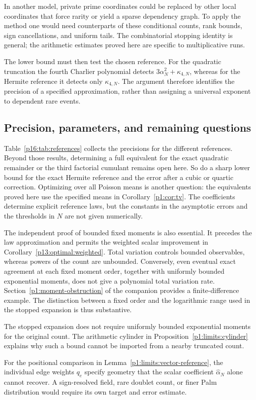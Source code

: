 In another model, private prime coordinates could be replaced by other
local coordinates that force rarity or yield a sparse dependency graph.
To apply the method one would need counterparts of these conditional
counts, rank bounds, sign cancellations, and uniform tails. The
combinatorial stopping identity is general; the arithmetic estimates
proved here are specific to multiplicative runs.

The lower bound must then test the chosen reference. For the quadratic
truncation the fourth Charlier polynomial detects
$3\alpha_N^2+\kappa_{4,N}$, whereas for the Hermite reference it detects
only $\kappa_{4,N}$. The argument therefore identifies the precision of a
specified approximation, rather than assigning a universal exponent to
dependent rare events.

\subsection{Precision, parameters, and remaining questions}

Table~\ref{p16:tab:references} collects the precisions for the
different references. Beyond those results, determining a full
equivalent for the exact quadratic remainder or the third factorial
cumulant remains open here. So do a sharp lower bound for the exact
Hermite reference and the error after a cubic or quartic correction.
Optimizing over all Poisson means is another question: the equivalents
proved here use the specified means in Corollary~\ref{p1:cor:tv}.
The coefficients determine explicit reference laws, but the constants
in the asymptotic errors and the thresholds in \(N\) are not given
numerically.

The independent proof of bounded fixed moments is also
essential. It precedes the law approximation and permits
the weighted scalar improvement in
Corollary~\ref{p13:optimal:weighted}.
Total variation controls bounded observables,
whereas powers of the count are unbounded. Conversely,
even eventual exact agreement at each fixed moment order, together
with uniformly bounded exponential moments, does not give
a polynomial total variation rate. Section~\ref{p1:moment-obstruction} of the companion
provides a finite-difference example. The distinction between
a fixed order and the logarithmic range used in the stopped
expansion is thus substantive.

The stopped expansion does not require uniformly bounded exponential
moments for the original count. The arithmetic cylinder in
Proposition~\ref{p1:limits:cylinder} explains why such a bound cannot be
imported from a nearby truncated count.

For the positional comparison in
Lemma~\ref{p1:limits:vector-reference}, the individual edge weights
\(q_e\) specify geometry that the scalar coefficient
\(\widehat\alpha_N\) alone cannot recover. A sign-resolved field,
rare doublet count, or finer Palm distribution would require its
own target and error estimate.
